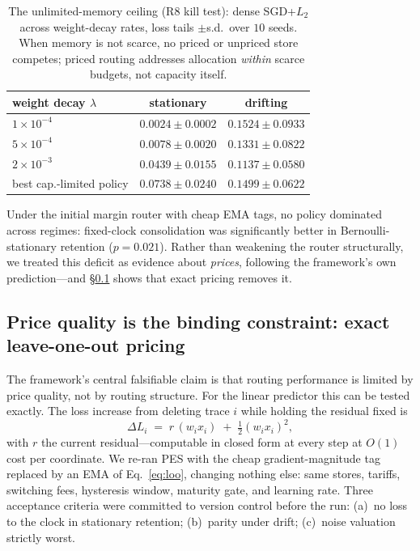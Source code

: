 \documentclass[10pt,twocolumn]{article}
\theoremstyle{definition}
\newcommand{\PES}{PES}
\begin{document}
\begin{table}[t]
\centering\small
\caption{The unlimited-memory ceiling ({R8} kill test): dense {SGD}+$L_2$ across weight-decay rates, loss
tails $\pm$s.d.\ over $10$ seeds. When memory is not scarce, no priced or unpriced store competes; priced
routing addresses allocation \emph{within} scarce budgets, not capacity itself.}
\label{tab:wd}
\setlength{\tabcolsep}{3pt}\footnotesize
\begin{tabular}{@{}lcc@{}}
\toprule
weight decay $\lambda$ & stationary & drifting \\
\midrule
$1\times10^{-4}$ & $0.0024\pm0.0002$ & $0.1524\pm0.0933$ \\
$5\times10^{-4}$ & $0.0078\pm0.0020$ & $0.1331\pm0.0822$ \\
$2\times10^{-3}$ & $0.0439\pm0.0155$ & $\mathbf{0.1137\pm0.0580}$ \\
\midrule
best cap.\--limited policy & $0.0738\pm0.0240$ & $0.1499\pm0.0622$ \\
\bottomrule
\end{tabular}
\end{table}

Under the initial margin router with cheap {EMA} tags, no policy dominated across regimes: fixed-clock
consolidation was significantly better in Bernoulli-stationary retention ($p=0.021$). Rather than weakening
the router structurally, we treated this deficit as evidence about \emph{prices}, following the framework's
own prediction---and \S\ref{sec:loo} shows that exact pricing removes it.

\subsection{Price quality is the binding constraint: exact leave-one-out pricing}\label{sec:loo}

The framework's central falsifiable claim is that routing performance is limited by price quality, not by
routing structure. For the linear predictor this can be tested exactly. The loss increase from deleting
trace $i$ while holding the residual fixed is
\begin{equation}
\Delta L_i \;=\; r\,(w_i x_i)\;+\;\tfrac{1}{2}(w_i x_i)^2,
\label{eq:loo}
\end{equation}
with $r$ the current residual---computable in closed form at every step at $O(1)$ cost per coordinate. We
re-ran \PES{} with the cheap gradient-magnitude tag replaced by an {EMA} of Eq.~\eqref{eq:loo}, changing
nothing else: same stores, tariffs, switching fees, hysteresis window, maturity gate, and learning rate.
Three acceptance criteria were committed to version control before the run: (a)~no loss to the clock in
stationary retention; (b)~parity under drift; (c)~noise valuation strictly worst.
\end{document}

